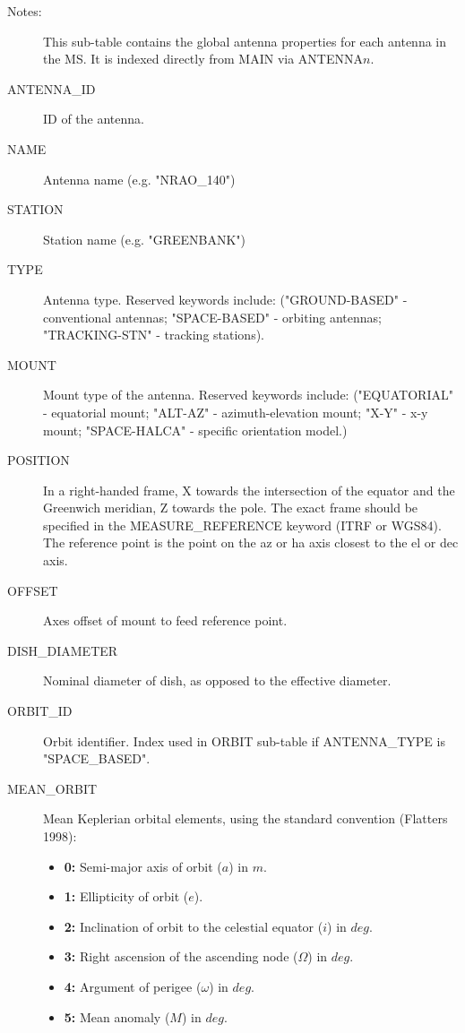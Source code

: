 \documentclass{article}
\begin{document}
\begin{description}

\item[Notes:] This sub-table contains the global antenna properties
for each antenna in the MS. It is indexed directly from MAIN via
ANTENNA$n$.
\item[ANTENNA\_ID] ID of the antenna.

\item[NAME] Antenna name (e.g. "NRAO\_140")

\item[STATION] Station name (e.g. "GREENBANK")

\item[TYPE] Antenna type. Reserved keywords include:
("GROUND-BASED" - conventional antennas; "SPACE-BASED" - orbiting
antennas; "TRACKING-STN" - tracking stations).

\item[MOUNT] Mount type of the antenna. Reserved keywords include:
("EQUATORIAL" - equatorial mount; "ALT-AZ" - azimuth-elevation mount; "X-Y"
- x-y mount; "SPACE-HALCA" - specific orientation model.)

\item[POSITION] In a right-handed frame, X towards the intersection of
the equator and the Greenwich meridian, Z towards the pole. The exact
frame should be specified in the MEASURE\_REFERENCE keyword (ITRF or
WGS84). The reference point is the point on the az or ha axis closest
to the el or dec axis.

\item[OFFSET] Axes offset of mount to feed reference point.

\item[DISH\_DIAMETER] Nominal diameter of dish, as opposed to the
effective diameter.

\item[ORBIT\_ID] Orbit identifier. Index used in ORBIT sub-table if
ANTENNA\_TYPE is "SPACE\_BASED".

\item[MEAN\_ORBIT] Mean Keplerian orbital elements, using the
standard convention (Flatters 1998): 
\begin{itemize}
   \item{{\bf 0:} Semi-major axis of orbit ($a$) in $m$.}
   \item{{\bf 1:} Ellipticity of orbit ($e$).}
   \item{{\bf 2:} Inclination of orbit to the celestial equator ($i$) 
                  in $deg.$}
   \item{{\bf 3:} Right ascension of the ascending node ($\Omega$) in $deg.$}
   \item{{\bf 4:} Argument of perigee ($\omega$) in $deg.$}
   \item{{\bf 5:} Mean anomaly ($M$) in $deg.$}
\end{itemize}

\end{description}
\end{document}
